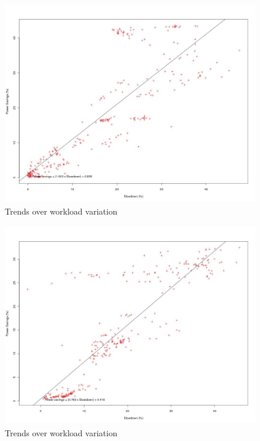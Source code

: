 \begin{figure}[h!]
  \begin{center}
    \includegraphics[height=3.5in]{figures/slowdown_power_ladder.jpg}%
    \caption{Trends over workload variation}
    \label{fig:slowdown_power_ladder}
  \end{center}
\end{figure}

\begin{figure}[h!]
  \begin{center}
    \includegraphics[height=3.5in]{figures/slowdown_power_select.jpg}%
    \caption{Trends over workload variation}
    \label{fig:slowdown_power_select}
  \end{center}
\end{figure}

